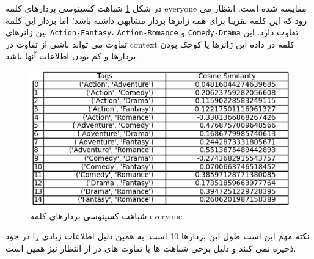 در شکل 
\ref{fig12}
شباهت کسینوسی بردارهای کلمه
everyone
مقایسه شده است. انتظار می رود که این کلمه تقریبا برای همه ژانرها بردار مشابهی داشته باشد؛ اما بردار این کلمه بین ژانرهای 
\texttt{Action-Fantasy}،
\texttt{Action-Romance}
و
\texttt{Comedy-Drama}
تفاوت دارد. این تفاوت می تواند ناشی از تفاوت در context کلمه در داده این ژانرها یا کوچک بودن بردارها و کم بودن اطلاعات آنها باشد.
 \begin{figure}[H]
	\centering
	
	\includegraphics[width=1\textwidth,height=1\textheight,keepaspectratio]{../report/word2vec/everyone}
	\caption{شباهت کسینوسی بردارهای کلمه everyone}
	\label{fig12}
	
\end{figure} 



نکته مهم این است طول این بردارها 10 است. به همین دلیل اطلاعات زیادی را در خود ذخیره نمی کنند و دلیل برخی شباهت ها یا تفاوت های در از انتظار نیز همین است. 